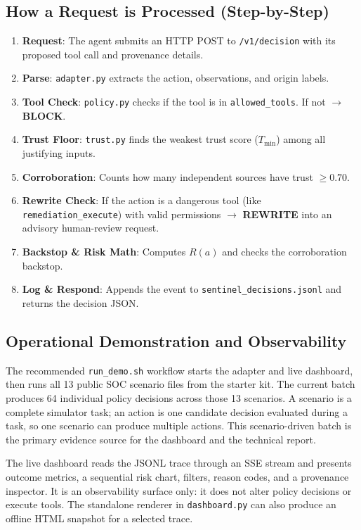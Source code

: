 \documentclass[11pt,a4paper]{article}
\begin{document}
\subsection{How a Request is Processed (Step-by-Step)}
\begin{enumerate}[leftmargin=1.5em]
    \item \textbf{Request}: The agent submits an HTTP POST to \texttt{/v1/decision} with its proposed tool call and provenance details.
    \item \textbf{Parse}: \texttt{adapter.py} extracts the action, observations, and origin labels.
    \item \textbf{Tool Check}: \texttt{policy.py} checks if the tool is in \texttt{allowed\_tools}. If not $\to$ \textbf{BLOCK}.
    \item \textbf{Trust Floor}: \texttt{trust.py} finds the weakest trust score ($T_{\min}$) among all justifying inputs.
    \item \textbf{Corroboration}: Counts how many independent sources have trust $\ge 0.70$.
    \item \textbf{Rewrite Check}: If the action is a dangerous tool (like \texttt{remediation\_execute}) with valid permissions $\to$ \textbf{REWRITE} into an advisory human-review request.
    \item \textbf{Backstop \& Risk Math}: Computes $R(a)$ and checks the corroboration backstop.
    \item \textbf{Log \& Respond}: Appends the event to \texttt{sentinel\_decisions.jsonl} and returns the decision JSON.
\end{enumerate}

\subsection{Operational Demonstration and Observability}
The recommended \texttt{run\_demo.sh} workflow starts the adapter and live dashboard,
then runs all 13 public SOC scenario files from the starter kit. The current batch
produces 64 individual policy decisions across those 13 scenarios. A scenario is a
complete simulator task; an action is one candidate decision evaluated during a task,
so one scenario can produce multiple actions. This scenario-driven batch is the
primary evidence source for the dashboard and the technical report.

The live dashboard reads the JSONL trace through an SSE stream and presents outcome
metrics, a sequential risk chart, filters, reason codes, and a provenance inspector.
It is an observability surface only: it does not alter policy decisions or execute
tools. The standalone renderer in \texttt{dashboard.py} can also produce an offline
HTML snapshot for a selected trace.
\end{document}
